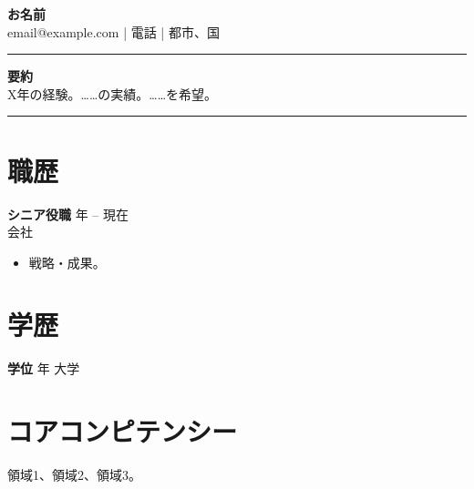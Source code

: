 \documentclass[11pt,a4paper]{article}
\begin{document}
\begin{center}
{\LARGE \textbf{お名前}}\\[0.2em]
email@example.com \quad | \quad 電話 \quad | \quad 都市、国
\end{center}
\begin{flushright}\rule{2cm}{2.5cm}\end{flushright}
\vspace{0.4em}
\noindent\textbf{要約}\\
X年の経験。……の実績。……を希望。

\vspace{0.5em}
\noindent\rule{\textwidth}{0.4pt}
\section*{職歴}
\textbf{シニア役職} \hfill 年 -- 現在 \\
会社 \\
\begin{itemize}
  \item 戦略・成果。
\end{itemize}
\section*{学歴}
\textbf{学位} \hfill 年 \quad 大学
\section*{コアコンピテンシー}
領域1、領域2、領域3。
\end{document}

